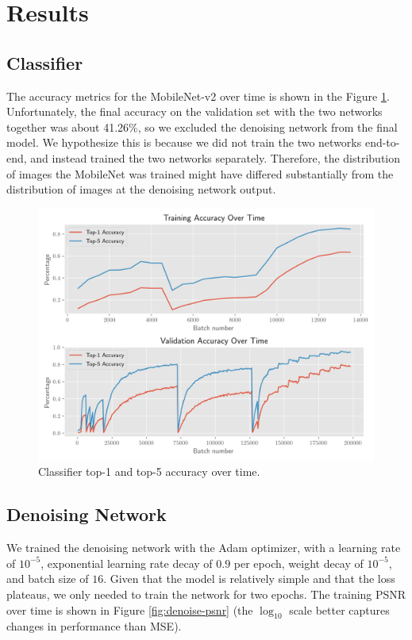\documentclass[justified]{article}
\begin{document}
  \section{Results}

  \subsection{Classifier}

  The accuracy metrics for the MobileNet-v2 over time is shown in the Figure \ref{fig:mobile}.
  Unfortunately, the final accuracy on the validation set with the two networks together was about 41.26\%, so we excluded the denoising network from the final model.
  We hypothesize this is because we did not train the two networks end-to-end, and instead trained the two networks separately.
  Therefore, the distribution of images the MobileNet was trained might have differed substantially from the distribution of images at the denoising network output.

  \begin{figure}[H]
    \centering
    \includegraphics[width=\textwidth]{figures/training}
    \caption{Classifier top-1 and top-5 accuracy over time.}
    \label{fig:mobile}
  \end{figure}

  \subsection{Denoising Network}

  We trained the denoising network with the Adam optimizer, with a learning rate of $10^{-5}$, exponential learning rate decay of $0.9$ per epoch, weight decay of $10^{-5}$, and batch size of $16$.
  Given that the model is relatively simple and that the loss plateaus, we only needed to train the network for two epochs.
  The training PSNR over time is shown in Figure \eqref{fig:denoise-psnr} (the $\log_{10}$ scale better captures changes in performance than MSE).
\end{document}
